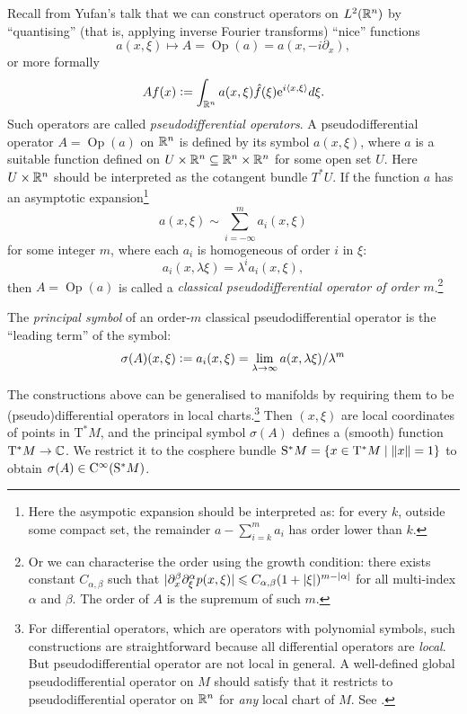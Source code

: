\documentclass[reqno]{scrartcl}
\theoremstyle{definition}
\theoremstyle{remark}
\newcommand{\Op}{\operatorname{Op}}
\begin{document}
Recall from Yufan's talk that we can construct operators on $L^2(\mathbb{R}^n)$ by ``quantising'' (that is, applying inverse Fourier transforms) ``nice'' functions
\[ a(x,\xi)\mapsto A=\Op(a)=a(x,-i\partial_x), \]
or more formally
\[ Af(x)\mathrel{\vcentcolon=}\int_{\mathbb{R}^n}a(x,\xi)\hat{f}(\xi)\mathrm{e}^{i\langle x,\xi\rangle}d\xi. \]
Such operators are called \emph{pseudodifferential operators}. A pseudodifferential operator $A=\Op(a)$ on $\mathbb{R}^n$ is defined by its symbol $a(x,\xi)$, where $a$ is a suitable function defined on $U\times\mathbb{R}^n\subseteq\mathbb{R}^n\times \mathbb{R}^n$ for some open set $U$. Here $U\times\mathbb{R}^n$ should be interpreted as the cotangent bundle $T^*U$. If the function $a$ has an asymptotic expansion\footnote{Here the asympotic expansion should be interpreted as: for every $k$, outside some compact set, the remainder $a-\sum_{i=k}^{m}a_i$ has order lower than $k$.}
\[ a(x,\xi)\sim\sum_{i=-\infty}^{m}a_i(x,\xi) \]
for some integer $m$, where each $a_i$ is homogeneous of order $i$ in $\xi$:
\[ a_i(x,\lambda\xi)=\lambda^ia_i(x,\xi), \]
then $A=\Op(a)$ is called a \emph{classical pseudodifferential operator of order $m$}.\footnote{Or we can characterise the order using the growth condition: there exists constant $C_{\alpha,\beta}$ such that $\lvert\partial_x^\beta\partial_\xi^\alpha p(x,\xi)\rvert\leqslant C_{\alpha,\beta}(1+\lvert\xi\rvert)^{m-\lvert\alpha\rvert}$ for all multi-index $\alpha$ and $\beta$. The order of $A$ is the supremum of such $m$.}

The \emph{principal symbol} of an order-$m$ classical pseudodifferential operator is the ``leading term'' of the symbol:
\[ \sigma(A)(x,\xi)\mathrel{\vcentcolon=} a_i(x,\xi)=\lim_{\lambda\to\infty}a(x,\lambda\xi)/\lambda^m \]

The constructions above can be generalised to manifolds by requiring them to be (pseudo)differential operators in local charts.\footnote{For differential operators, which are operators with polynomial symbols, such constructions are straightforward because all differential operators are \emph{local}. But pseudodifferential operator are not local in general. A well-defined global pseudodifferential operator on $M$ should satisfy that it restricts to pseudodifferential operator on $\mathbb{R}^n$ for \emph{any} local chart of $M$. See \cite{treves2013introduction}.} Then $(x,\xi)$ are local coordinates of points in $\mathrm{T}^*M$, and the principal symbol $\sigma(A)$ defines a (smooth) function $\mathrm{T}^*M\to\mathbb{C}$. We restrict it to the cosphere bundle $\mathrm{S}^*M=\{x\in \mathrm{T}^*M\mid\lVert x\rVert=1\}$ to obtain $\sigma(A)\in\mathrm{C}^\infty(\mathrm{S}^*M)$. 
\end{document}
